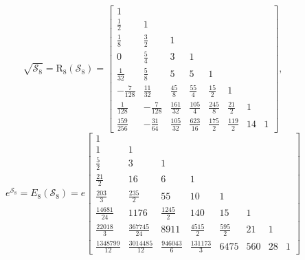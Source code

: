 \begin{example}
\begin{displaymath}
\sqrt{\mathcal{S}_{8}} = \operatorname{R_{ 8 }}{\left (\mathcal{S}_{ 8 } \right )} = \left[\begin{matrix}1 &  &  &  &  &  &  & \\\frac{1}{2} & 1 &  &  &  &  &  & \\\frac{1}{8} & \frac{3}{2} & 1 &  &  &  &  & \\0 & \frac{5}{4} & 3 & 1 &  &  &  & \\\frac{1}{32} & \frac{5}{8} & 5 & 5 & 1 &  &  & \\- \frac{7}{128} & \frac{11}{32} & \frac{45}{8} & \frac{55}{4} & \frac{15}{2} & 1 &  & \\\frac{1}{128} & - \frac{7}{128} & \frac{161}{32} & \frac{105}{4} & \frac{245}{8} & \frac{21}{2} & 1 & \\\frac{159}{256} & - \frac{31}{64} & \frac{105}{32} & \frac{623}{16} & \frac{175}{2} & \frac{119}{2} & 14 & 1\end{matrix}\right],
\end{displaymath}
\begin{displaymath}
e^{\mathcal{S}_{8}} = E_{8}\left( \mathcal{S}_{8}\right) = e \left[\begin{matrix}1 &  &  &  &  &  &  & \\1 & 1 &  &  &  &  &  & \\\frac{5}{2} & 3 & 1 &  &  &  &  & \\\frac{21}{2} & 16 & 6 & 1 &  &  &  & \\\frac{203}{3} & \frac{235}{2} & 55 & 10 & 1 &  &  & \\\frac{14681}{24} & 1176 & \frac{1245}{2} & 140 & 15 & 1 &  & \\\frac{22018}{3} & \frac{367745}{24} & 8911 & \frac{4515}{2} & \frac{595}{2} & 21 & 1 & \\\frac{1348799}{12} & \frac{3014485}{12} & \frac{946043}{6} & \frac{131173}{3} & 6475 & 560 & 28 & 1\end{matrix}\right]

\end{displaymath}
\end{example}

